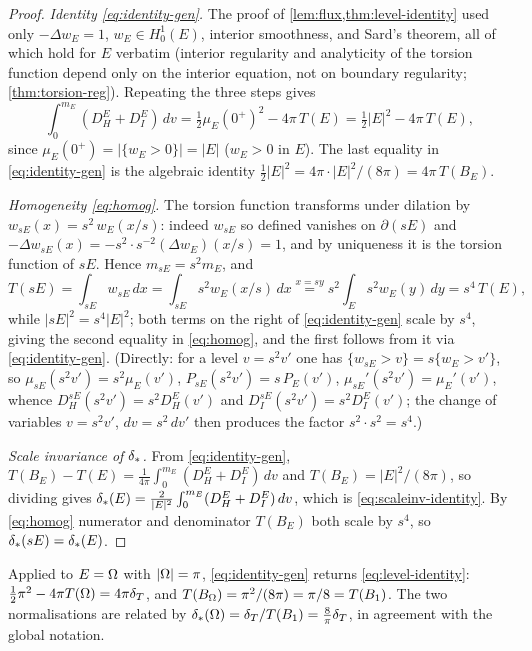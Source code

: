 \begin{proof}
\emph{Identity \eqref{eq:identity-gen}.} The proof of
\cref{lem:flux,thm:level-identity} used only $-\Delta w_E=1$, $w_E\in
H^1_0(E)$, interior smoothness, and Sard's theorem, all of which hold for $E$
verbatim (interior regularity and analyticity of the torsion function depend
only on the interior equation, not on boundary regularity;
\cref{thm:torsion-reg}). Repeating the three steps gives
\[
   \int_0^{m_E}(D_H^E+D_I^E)\,dv
   =\tfrac12\mu_E(0^+)^2-4\pi\,T(E)
   =\tfrac12|E|^2-4\pi\,T(E),
\]
since $\mu_E(0^+)=|\{w_E>0\}|=|E|$ ($w_E>0$ in $E$). The last equality in
\eqref{eq:identity-gen} is the algebraic identity
$\tfrac12|E|^2=4\pi\cdot|E|^2/(8\pi)=4\pi\,T(B_E)$.

\emph{Homogeneity \eqref{eq:homog}.} The torsion function transforms under
dilation by $w_{sE}(x)=s^2\,w_E(x/s)$: indeed $w_{sE}$ so defined vanishes on
$\partial(sE)$ and $-\Delta w_{sE}(x)=-s^2\cdot s^{-2}(\Delta w_E)(x/s)=1$,
and by uniqueness it is the torsion function of $sE$. Hence
$m_{sE}=s^2 m_E$, and
\[
   T(sE)=\int_{sE}w_{sE}\,dx=\int_{sE}s^2 w_E(x/s)\,dx
   \overset{x=sy}{=}s^2\!\int_E s^2 w_E(y)\,dy=s^4\,T(E),
\]
while $|sE|^2=s^4|E|^2$; both terms on the right of \eqref{eq:identity-gen}
scale by $s^4$, giving the second equality in \eqref{eq:homog}, and the first
follows from it via \eqref{eq:identity-gen}. (Directly: for a level $v=s^2v'$
one has $\{w_{sE}>v\}=s\{w_E>v'\}$, so $\mu_{sE}(s^2v')=s^2\mu_E(v')$,
$P_{sE}(s^2v')=s\,P_E(v')$, $\mu_{sE}'(s^2v')=\mu_E'(v')$, whence
$D_H^{sE}(s^2v')=s^2 D_H^E(v')$ and $D_I^{sE}(s^2v')=s^2 D_I^E(v')$; the
change of variables $v=s^2v'$, $dv=s^2\,dv'$ then produces the factor
$s^2\cdot s^2=s^4$.)

\emph{Scale invariance of $\delta_{*}$.} From \eqref{eq:identity-gen},
$T(B_E)-T(E)=\tfrac{1}{4\pi}\int_0^{m_E}(D_H^E+D_I^E)\,dv$ and
$T(B_E)=|E|^2/(8\pi)$, so dividing gives
$\delta_{*}(E)=\tfrac{2}{|E|^2}\int_0^{m_E}(D_H^E+D_I^E)\,dv$, which is
\eqref{eq:scaleinv-identity}. By \eqref{eq:homog} numerator and denominator
$T(B_E)$ both scale by $s^4$, so $\delta_{*}(sE)=\delta_{*}(E)$.
\end{proof}

\begin{remark}\label{rem:consistency}
Applied to $E=\Omega$ with $|\Omega|=\pi$, \eqref{eq:identity-gen} returns
\eqref{eq:level-identity}: $\tfrac12\pi^2-4\pi T(\Omega)=4\pi\delta_T$, and
$T(B_\Omega)=\pi^2/(8\pi)=\pi/8=T(B_1)$. The two normalisations are related by
$\delta_{*}(\Omega)=\delta_T/T(B_1)=\tfrac8\pi\delta_T$, in agreement with the global
notation.
\end{remark}

